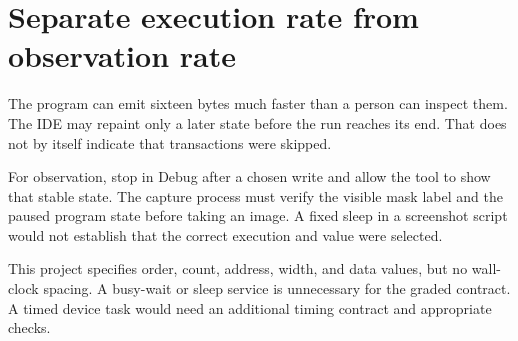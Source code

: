 \section{Separate execution rate from observation
  rate}\label{005-seven-segment-counter-p10-separate-execution-rate-from-observation-rate}

The program can emit sixteen bytes much faster than a person can inspect
them. The IDE may repaint only a later state before the run reaches its
end. That does not by itself indicate that transactions were skipped.

For observation, stop in Debug after a chosen write and allow the tool
to show that stable state. The capture process must verify the visible
mask label and the paused program state before taking an image. A fixed
sleep in a screenshot script would not establish that the correct
execution and value were selected.

This project specifies order, count, address, width, and data values,
but no wall-clock spacing. A busy-wait or sleep service is unnecessary
for the graded contract. A timed device task would need an additional
timing contract and appropriate checks.
